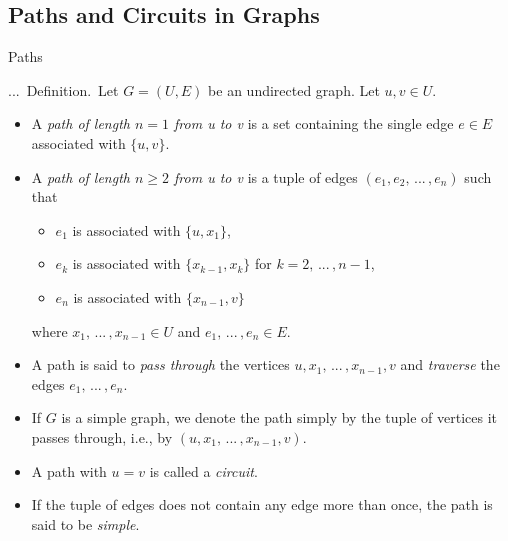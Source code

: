\documentclass[smaller,hyperref={CJKbookmarks=true}]{beamer}
\newcounter{zhuo}[subsection]
\renewcommand{\thezhuo}{\thesection.\thesubsection.\arabic{zhuo}}
\newenvironment{DEFINITION}{\stepcounter{zhuo}\alert{\thezhuo.~Definition.\,}}{}
\begin{document}
\subsection{Paths and Circuits in Graphs}
\begin{frame}[c] \begin{spacing}{2.5}
\tableofcontents[sectionstyle=hide,subsectionstyle=show/shaded/hide] \end{spacing}
\end{frame}
\begin{frame}[t]{Paths}
\begin{spacing}{1.05}
\begin{DEFINITION}
Let $G=(U,E)$ be an undirected graph. Let $u,v\in U$.
\begin{itemize}
  \item A \emph{path of length $n=1$ from u to v} is a set containing the single edge $e\in E$ associated with $\{u,v\}$.
  \item A \emph{path of length $n\geq2$ from u to v} is a tuple of edges $(e_1,e_2,\,...\,,e_n)$ such that
      \begin{itemize}
        \item $e_1$ is associated with $\{u,x_1\}$,
        \item $e_k$ is associated with $\{x_{k-1},x_k\}$ for $k=2,\,...\,,n-1$,
        \item $e_n$ is associated with $\{x_{n-1},v\}$
      \end{itemize}
      where $x_1,\,...\,,x_{n-1}\in U$ and $e_1,\,...\,,e_n\in E$.
  \item A path is said to \emph{pass through} the vertices $u,x_1,\,...\,,x_{n-1},v$ and \emph{traverse} the edges $e_1,\,...\,,e_n$.
  \item If $G$ is a simple graph, we denote the path simply by the tuple of vertices it passes through, i.e., by $(u,x_1,\,...\,,x_{n-1},v)$.
  \item A path with $u=v$ is called a \emph{circuit}.
  \item If the tuple of edges does not contain any edge more than once, the path is said to be \emph{simple}.
\end{itemize}
\end{DEFINITION}
\end{spacing}
\end{frame}
\end{document}
